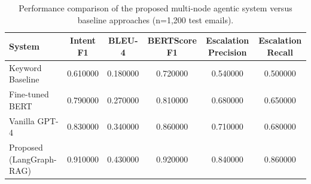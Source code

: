 \begin{table}
\caption{Performance comparison of the proposed multi-node agentic system versus baseline approaches (n=1,200 test emails).}
\label{tab:tab01_baseline_comparison}
\begin{tabular}{lccccc}
\toprule
System & Intent F1 & BLEU-4 & BERTScore F1 & Escalation Precision & Escalation Recall \\
\midrule
Keyword Baseline & 0.610000 & 0.180000 & 0.720000 & 0.540000 & 0.500000 \\
Fine-tuned BERT & 0.790000 & 0.270000 & 0.810000 & 0.680000 & 0.650000 \\
Vanilla GPT-4 & 0.830000 & 0.340000 & 0.860000 & 0.710000 & 0.680000 \\
Proposed (LangGraph-RAG) & 0.910000 & 0.430000 & 0.920000 & 0.840000 & 0.860000 \\
\bottomrule
\end{tabular}
\end{table}
